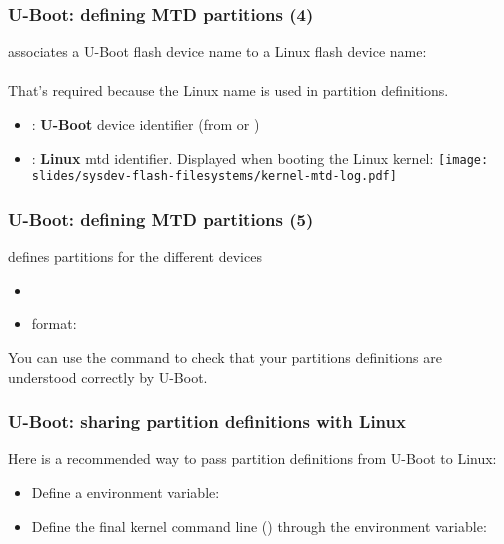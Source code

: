 \begin{frame}[fragile]
  \frametitle{U-Boot: defining MTD partitions (4)}
   associates a U-Boot flash device name
  to a Linux flash device name:\\
  \\
  \vspace{0.5cm}
  That's required because the Linux name is used in partition definitions.
  \begin{itemize}
  \item {}: {\bf U-Boot} device identifier (from
     or )
  \item {}: {\bf Linux} mtd identifier. Displayed
    when booting the Linux kernel:
    \texttt{[image: slides/sysdev-flash-filesystems/kernel-mtd-log.pdf]}\\
  \end{itemize}
\end{frame}

\begin{frame}[fragile]
  \frametitle{U-Boot: defining MTD partitions (5)}
   defines partitions for the different devices\\
  \begin{itemize}
    \item {}
    \item {} format: 
  \end{itemize}
  You can use the  command to check that your partitions
  definitions are understood correctly by U-Boot.
\end{frame}

\begin{frame}
  \frametitle{U-Boot: sharing partition definitions with Linux}
  Here is a recommended way to pass partition definitions from U-Boot to Linux:
  \begin{itemize}
  \item Define a  environment variable:\\
  \item Define the final kernel command line ()
    through the  environment variable:
  \end{itemize}
\end{frame}

